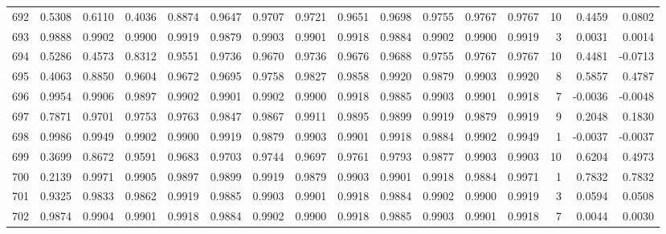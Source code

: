 \begin{tabular}{lrrrrrrrrrrrrrrr}
692 &      0.5308 &  0.6110 &  0.4036 &  0.8874 &  0.9647 &  0.9707 &  0.9721 &  0.9651 &  0.9698 &  0.9755 &   0.9767 &     0.9767 &     10 &                    0.4459 &                     0.0802 \\
693 &      0.9888 &  0.9902 &  0.9900 &  0.9919 &  0.9879 &  0.9903 &  0.9901 &  0.9918 &  0.9884 &  0.9902 &   0.9900 &     0.9919 &      3 &                    0.0031 &                     0.0014 \\
694 &      0.5286 &  0.4573 &  0.8312 &  0.9551 &  0.9736 &  0.9670 &  0.9736 &  0.9676 &  0.9688 &  0.9755 &   0.9767 &     0.9767 &     10 &                    0.4481 &                    -0.0713 \\
695 &      0.4063 &  0.8850 &  0.9604 &  0.9672 &  0.9695 &  0.9758 &  0.9827 &  0.9858 &  0.9920 &  0.9879 &   0.9903 &     0.9920 &      8 &                    0.5857 &                     0.4787 \\
696 &      0.9954 &  0.9906 &  0.9897 &  0.9902 &  0.9901 &  0.9902 &  0.9900 &  0.9918 &  0.9885 &  0.9903 &   0.9901 &     0.9918 &      7 &                   -0.0036 &                    -0.0048 \\
697 &      0.7871 &  0.9701 &  0.9753 &  0.9763 &  0.9847 &  0.9867 &  0.9911 &  0.9895 &  0.9899 &  0.9919 &   0.9879 &     0.9919 &      9 &                    0.2048 &                     0.1830 \\
698 &      0.9986 &  0.9949 &  0.9902 &  0.9900 &  0.9919 &  0.9879 &  0.9903 &  0.9901 &  0.9918 &  0.9884 &   0.9902 &     0.9949 &      1 &                   -0.0037 &                    -0.0037 \\
699 &      0.3699 &  0.8672 &  0.9591 &  0.9683 &  0.9703 &  0.9744 &  0.9697 &  0.9761 &  0.9793 &  0.9877 &   0.9903 &     0.9903 &     10 &                    0.6204 &                     0.4973 \\
700 &      0.2139 &  0.9971 &  0.9905 &  0.9897 &  0.9899 &  0.9919 &  0.9879 &  0.9903 &  0.9901 &  0.9918 &   0.9884 &     0.9971 &      1 &                    0.7832 &                     0.7832 \\
701 &      0.9325 &  0.9833 &  0.9862 &  0.9919 &  0.9885 &  0.9903 &  0.9901 &  0.9918 &  0.9884 &  0.9902 &   0.9900 &     0.9919 &      3 &                    0.0594 &                     0.0508 \\
702 &      0.9874 &  0.9904 &  0.9901 &  0.9918 &  0.9884 &  0.9902 &  0.9900 &  0.9918 &  0.9885 &  0.9903 &   0.9901 &     0.9918 &      7 &                    0.0044 &                     0.0030 \\

\end{tabular}
